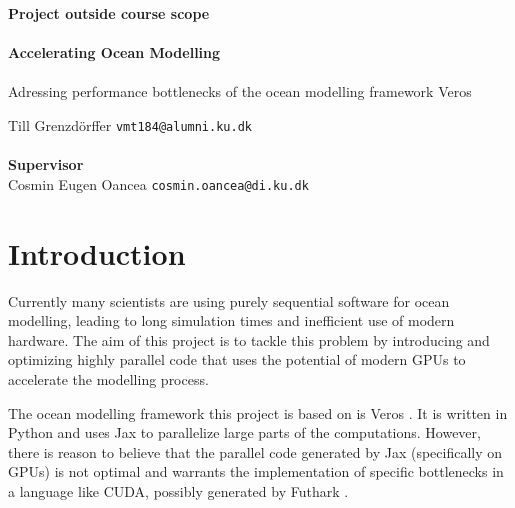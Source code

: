 \documentclass[a4paper,oneside]{memoir}
\begin{document}
    \thispagestyle{empty}
    \begin{adjustwidth}{-3cm}{-1.5cm}
    \vspace*{-1cm}
    \textbf{\Huge Project outside course scope} \\
    \vspace*{2.5cm} \\
    \textbf{\Huge Accelerating Ocean Modelling} \\
    \vspace*{.1cm} \\
    {\huge Adressing performance bottlenecks of the ocean modelling framework Veros} \\
    \begin{tabbing}
    Till Grenzdörffer \hspace{1cm} \= \texttt{vmt184@alumni.ku.dk} \\
    \\[12cm]
    \textbf{\Large Supervisor} \\
    Cosmin Eugen Oancea \> \texttt{cosmin.oancea@di.ku.dk} \\
    \end{tabbing}
    \end{adjustwidth}
    \newpage
    \ClearWallPaper



\section{Introduction}
Currently many scientists are using purely sequential software for ocean modelling, leading to long simulation times and inefficient use of modern hardware. 
The aim of this project is to tackle this problem by introducing and optimizing highly parallel code that uses the potential of modern GPUs to accelerate the modelling process.

The ocean modelling framework this project is based on is Veros \cite{veros}. It is written in Python and uses Jax \cite{jax2018github} to parallelize large parts of the computations.
However, there is reason to believe that the parallel code generated by Jax (specifically on GPUs) is not optimal and warrants the implementation of specific bottlenecks in a language like CUDA, possibly generated by Futhark \cite{futhark}.
\end{document}
